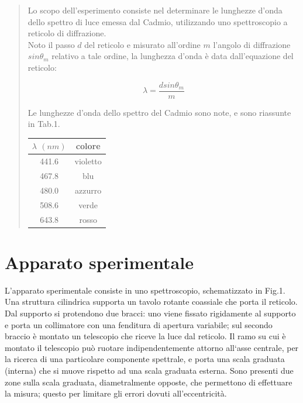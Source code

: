 \documentclass{article}
\begin{document}
\tableofcontents

\newpage
\begin{abstract}
Lo scopo dell'esperimento consiste nel determinare le lunghezze d'onda dello spettro di luce emessa dal Cadmio, utilizzando uno spettroscopio a reticolo di diffrazione. \\
Noto il passo $d$ del reticolo e misurato all'ordine $m$ l'angolo di diffrazione $sin\theta_{m}$ relativo a tale ordine, la lunghezza d'onda è data dall'equazione del reticolo: 

\begin{equation}
\lambda =  \frac{d sin\theta_m}{m}
\end{equation}

Le lunghezze d'onda dello spettro del Cadmio sono note, e sono riassunte in Tab.1. 

\begin{center}
 \begin{tabular}{|c|c|}
   \hline
   $\lambda$ $(nm)$ & colore \\ \hline
   441.6 & violetto \\
   467.8 & blu \\
   480.0 & azzurro \\
   508.6 & verde \\
   643.8 & rosso \\ \hline
 \end{tabular}
\end{center}

\end{abstract}

\newpage
\section{Apparato sperimentale}

L'apparato sperimentale consiste in uno spettroscopio, schematizzato in Fig.1. \\
Una struttura cilindrica supporta un tavolo rotante coassiale che porta il reticolo. Dal supporto si protendono due bracci: uno viene fissato rigidamente al supporto e porta un collimatore con una fenditura di apertura variabile; sul secondo braccio è montato un telescopio che riceve la luce dal reticolo. Il ramo su cui è montato il telescopio può ruotare indipendentemente attorno all`asse centrale, per la ricerca di una particolare componente spettrale, e porta una scala graduata (interna) che si muove rispetto ad una scala graduata esterna. Sono presenti due zone sulla scala graduata, diametralmente opposte, che permettono di effettuare la misura; questo per limitare gli errori dovuti all'eccentricità.
\end{document}
